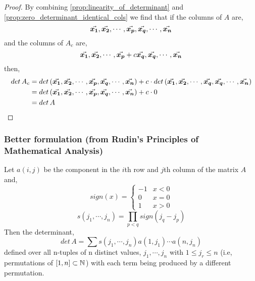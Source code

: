 \documentclass[../MathsNotesBase.tex]{subfiles}
\begin{document}
{		
		\begin{proof}
			By combining \autoref{prop:linearity_of_determinant} and \autoref{prop:zero_determinant_identical_cols} we find that if the columns of $A$ are,
			\[ \vec{\bm{x_1}}, \vec{\bm{x_2}}, \cdots ,  \vec{\bm{x_p}}, \vec{\bm{x_q}}, \cdots, \vec{\bm{x_n}} \]
			and the columns of $A_c$ are,
			\[ \vec{\bm{x_1}}, \vec{\bm{x_2}}, \cdots , \vec{\bm{x_p}} + c\vec{\bm{x_q}}, \vec{\bm{x_q}}, \cdots , \vec{\bm{x_n}} \]
			then,
			\begin{align*} 
				det\,A_c &= det\,(\vec{\bm{x_1}}, \vec{\bm{x_2}}, \cdots ,  \vec{\bm{x_p}}, \vec{\bm{x_q}}, \cdots, \vec{\bm{x_n}}) + c \cdot det\,(\vec{\bm{x_1}}, \vec{\bm{x_2}}, \cdots ,  \vec{\bm{x_q}}, \vec{\bm{x_q}}, \cdots, \vec{\bm{x_n}})\\
						 &= det\,(\vec{\bm{x_1}}, \vec{\bm{x_2}}, \cdots ,  \vec{\bm{x_p}}, \vec{\bm{x_q}}, \cdots, \vec{\bm{x_n}}) + c \cdot 0\\
						 &= det\,A
			\end{align*}
		\end{proof}
	
		\subsubsection{Better formulation \tiny{(from Rudin's Principles of Mathematical Analysis)}}\label{sssection:determinant_formula}
		Let $a(i,j)$ be the component in the $i$th row and $j$th column of the matrix $A$ and, 
		\[ sign(x) = \begin{cases} 
						-1 & x < 0 \\
						0 & x = 0 \\
						1 & x > 0 
					 \end{cases} 
		\]
		\[ s(j_1,\cdots,j_n) = \prod_{p < q}{sign(j_q - j_p)} \]
		Then the determinant,
		\[ det\, A = \sum s(j_1,\cdots,j_n)a(1,j_1) \cdots a(n,j_n) \]
		defined over all n-tuples of n distinct values, $j_1, \cdots, j_n$ with ${1 \leq j_r \leq n}$ (i.e, permutations of $[1,n] \subset \mathbb{N}^{}$) with each term being produced by a different permutation. 
		\bigskip
		
}
\end{document}

